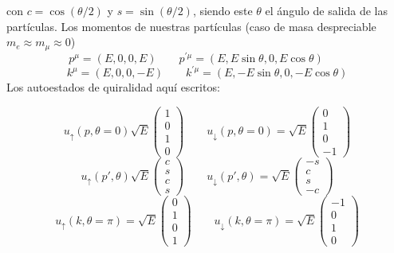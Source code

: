 con $c=\cos (\theta/2)$ y $s=\sin(\theta/2)$, siendo este $\theta$ el ángulo de salida de las partículas. Los momentos de nuestras partículas (caso de masa despreciable $m_e\approx m_\mu\approx 0$)
\begin{equation}
    p^\mu= (E,0,0,E) \qquad 
    p^{\prime\mu}= (E,E\sin \theta,0,E \cos \theta) \qquad 
\end{equation}
\begin{equation}
    k^\mu= (E,0,0,-E) \qquad 
    k^{\prime\mu}= (E,-E\sin \theta,0,-E \cos \theta)
\end{equation}
Los autoestados de quiralidad aquí escritos: 

\begin{equation} 
	u_\uparrow(p,\theta=0) \sqrt{E} \begin{pmatrix}
		1 \\ 0 \\ 1 \\ 0
	\end{pmatrix} \qquad 
	u_\downarrow(p,\theta=0)= \sqrt{E} \begin{pmatrix}
		0 \\ 1 \\ 0 \\ -1
	\end{pmatrix}
\end{equation}
\begin{equation} 
	u_\uparrow(p',\theta) \sqrt{E} \begin{pmatrix}
		c \\ s \\ c \\ s
	\end{pmatrix} \qquad 
	u_\downarrow(p',\theta)= \sqrt{E} \begin{pmatrix}
		-s \\ c \\ s \\ -c
	\end{pmatrix}
\end{equation}
\begin{equation}
	u_\uparrow(k,\theta=\pi) = \sqrt{E} \begin{pmatrix}
		0 \\ 1 \\ 0 \\ 1
	\end{pmatrix}  \qquad 
	u_\downarrow(k,\theta=\pi) = \sqrt{E} \begin{pmatrix}
		-1 \\ 0 \\ 1 \\ 0
	\end{pmatrix} 
\end{equation}
